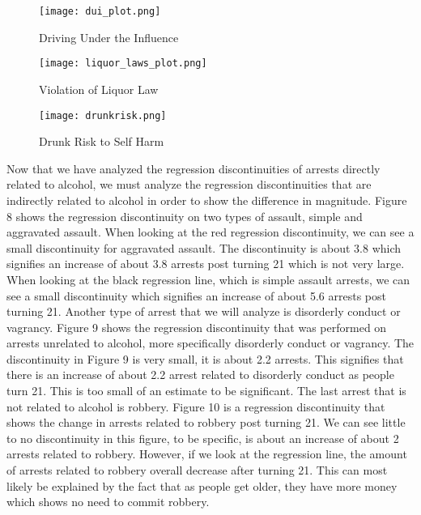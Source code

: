 \documentclass[a4paper]{article}
\begin{document}
\begin{figure}[h!]
    \centering
    \caption{Driving Under the Influence}
    \texttt{[image: dui\_plot.png]}
    \label{fig:my_label}
\end{figure}

\begin{figure}[h!]
    \centering
    \caption{Violation of Liquor Law}
    \texttt{[image: liquor\_laws\_plot.png]}
    \label{fig:my_label}
\end{figure}

\begin{figure}[h!]
    \centering
    \caption{Drunk Risk to Self Harm}
    \texttt{[image: drunkrisk.png]}
    \label{fig:my_label}
\end{figure}

\par
Now that we have analyzed the regression discontinuities of arrests directly related to alcohol, we must analyze the regression discontinuities that are indirectly related to alcohol in order to show the difference in magnitude. Figure 8 shows the regression discontinuity on two types of assault, simple and aggravated assault. When looking at the red regression discontinuity, we can see a small discontinuity for aggravated assault. The discontinuity is about 3.8 which signifies an increase of about 3.8 arrests post turning 21 which is not very large. When looking at the black regression line, which is simple assault arrests, we can see a small discontinuity which signifies an increase of about 5.6 arrests post turning 21. Another type of arrest that we will analyze is disorderly conduct or vagrancy. Figure 9 shows the regression discontinuity that was performed on arrests unrelated to alcohol, more specifically disorderly conduct or vagrancy. The discontinuity in Figure 9 is very small, it is about 2.2 arrests. This signifies that there is an increase of about 2.2 arrest related to disorderly conduct as people turn 21. This is too small of an estimate to be significant. The last arrest that is not related to alcohol is robbery. Figure 10 is a regression discontinuity that shows the change in arrests related to robbery post turning 21. We can see little to no discontinuity in this figure, to be specific, is about an increase of about 2 arrests related to robbery. However, if we look at the regression line, the amount of arrests related to robbery overall decrease after turning 21. This can most likely be explained by the fact that as people get older, they have more money which shows no need to commit robbery. 
\end{document}
